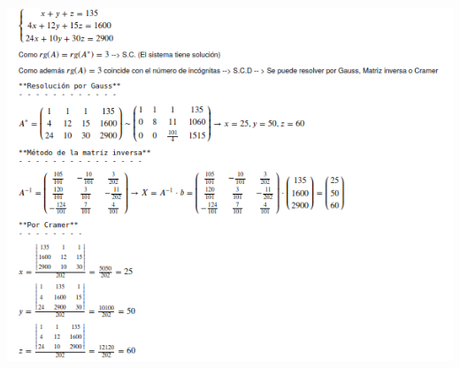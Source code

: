 \documentclass[addpoints,spanish, 12pt,a4paper]{exam}
\begin{document}
\begin{questions}
\begin{solution}\\
\includegraphics[scale=0.8]{sis1}
\end{solution}















\end{questions}
\end{document}
